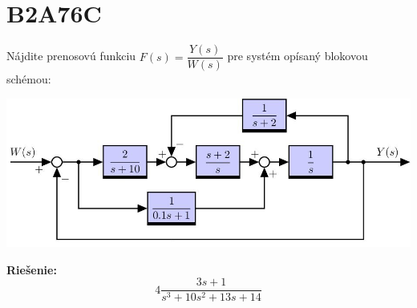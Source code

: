 \documentclass[a4paper, 12pt]{article}
\newenvironment{task}{}{}
\newenvironment{solution}{\noindent\textbf{Riešenie:}}{}
\begin{document}
\section*{B2A76C}
\begin{task}
    Nájdite prenosovú funkciu $F(s)=\dfrac{Y(s)}{W(s)}$ pre systém opísaný blokovou schémou: 

    \includegraphics{../assignments/images/blokovka01_00004.jpg} 
\end{task} 

\begin{solution}
    \begin{equation*}
        4\dfrac{3s+1}{s^3+10s^2+13s+14}
    \end{equation*}
\end{solution}
\end{document}
